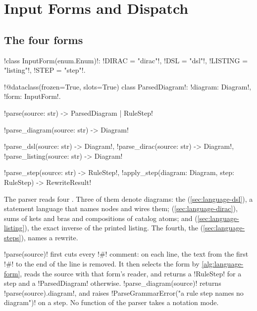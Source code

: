 \section{Input Forms and Dispatch}\label{sec:language-forms}

\subsection{The four forms}

\begin{signature}
\py!class InputForm(enum.Enum)!: \code!DIRAC = "dirac"!, \code!DSL = "dsl"!, \code!LISTING = "listing"!, \code!STEP = "step"!.

\py!@dataclass(frozen=True, slots=True) class ParsedDiagram!: \py!diagram: Diagram!, \py!form: InputForm!.

\py!parse(source: str) -> ParsedDiagram | RuleStep!

\py!parse_diagram(source: str) -> Diagram!

\py!parse_dsl(source: str) -> Diagram!, \py!parse_dirac(source: str) -> Diagram!, \py!parse_listing(source: str) -> Diagram!

\py!parse_step(source: str) -> RuleStep!, \py!apply_step(diagram: Diagram, step: RuleStep) -> RewriteResult!
\end{signature}

The parser reads four . Three of them denote diagrams: the  (\cref{sec:language-dsl}), a statement language that names nodes and wires them;  (\cref{sec:language-dirac}), sums of kets and bras and compositions of catalog atoms; and  (\cref{sec:language-listing}), the exact inverse of the printed listing. The fourth, the  (\cref{sec:language-steps}), names a rewrite.

\py!parse(source)! first cuts every \code!#! comment: on each line, the text from the first \code!#! to the end of the line is removed. It then selects the form by \cref{alg:language-form}, reads the source with that form's reader, and returns a \py!RuleStep! for a step and a \py!ParsedDiagram! otherwise. \py!parse_diagram(source)! returns \py!parse(source).diagram!, and raises \code!ParseGrammarError("a rule step names no diagram")! on a step. No function of the parser takes a notation mode.

